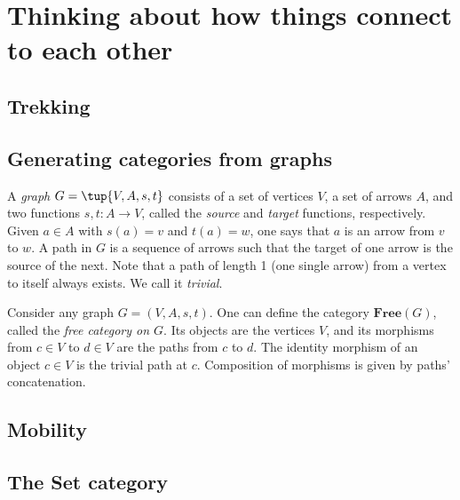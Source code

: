 \section{Thinking about how things connect to each other}
\subsection{Trekking}


\subsection{Generating categories from graphs}

\begin{definition}[Graph]
A \emph{graph} $G=\tup{V,A,s,t}$ consists of a set of vertices $V$, a set of arrows $A$, and two functions $s,t\colon A\to V$, called the \emph{source} and \emph{target} functions, respectively. Given $a\in A$ with $s(a)=v$ and $t(a)=w$, one says that $a$ is an arrow from $v$ to $w$. A path in $G$ is a sequence of arrows such that the target of one arrow is the source of the next. Note that a path of length 1 (one single arrow) from a vertex to itself always exists. We call it \emph{trivial}.
\end{definition}

\begin{shaded}
\begin{definition}
Consider any graph $G=(V,A,s,t)$. One can define the category $\mathbf{Free}(G)$, called the \emph{free category on $G$}. Its objects are the vertices $V$, and its morphisms from $c\in V$ to $d\in V$ are the paths from $c$ to $d$. The identity morphism of an object $c\in V$ is the trivial path at $c$. Composition of morphisms is given by paths' concatenation.
\end{definition}
\end{shaded}


\subsection{Mobility}



\subsection{The Set category}


